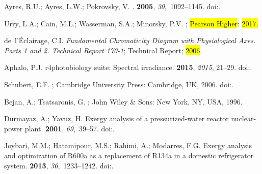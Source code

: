 \documentclass[energies,article,accept,moreauthors,pdftex]{Definitions/mdpi}\usepackage[]{graphicx}\usepackage[]{color}
\begin{document}
\begin{thebibliography}{999}
Ayres, R.U.; Ayres, L.W.; Pokrovsky, V.
.
 {\bf 2005}, {\em 30},~1092--1145.
\newblock
  doi:{\href{https://doi.org/10.1016/j.energy.2004.07.012}{}}.%

Urry, L.A.; Cain, M.L.; Wasserman, S.A.; Minorsky, P.V.
; \hl{Pearson Higher}:  \hl{2017.} %


de~l'{\'E}clairage, C.I.
\newblock \emph{Fundamental Chromaticity Diagram with Physiological Axes. Parts 1 and
  2. Technical Report 170-1};
\newblock Technical Report;  \hl{2006}.%

Aphalo, P.J.
\newblock r4photobiology suite: Spectral irradiance.
 {\bf 2015}, \emph{2015}, 21--29.
\newblock
  doi:{\href{https://doi.org/10.19232/uv4pb.2015.1.14}{}}.%

Schubert, E.F.
; Cambridge University Press: Cambridge,
  UK,  2006.
\newblock
  doi:{\href{https://doi.org/10.1017/CBO9780511790546}{}}.%


Bejan, A.; Tsatsaronis, G.
; John Wiley \& Sons: New York, NY, USA,
  1996.%

Durmayaz, A.; Yavuz, H.
\newblock Exergy analysis of a pressurized-water reactor nuclear-power plant.
 {\bf 2001}, {\em 69},~39--57.
\newblock
  doi:{\href{https://doi.org/10.1016/s0306-2619(00)00071-4}{}}.%

Joybari, M.M.; Hatamipour, M.S.; Rahimi, A.; Modarres, F.G.
\newblock Exergy analysis and optimization of {R600a} as a replacement of
  {R134a} in a domestic refrigerator system.
 {\bf 2013}, {\em
  36},~1233--1242.
\newblock
  doi:{\href{https://doi.org/10.1016/j.ijrefrig.2013.02.012}{}}.%


\end{thebibliography}
\end{document}
